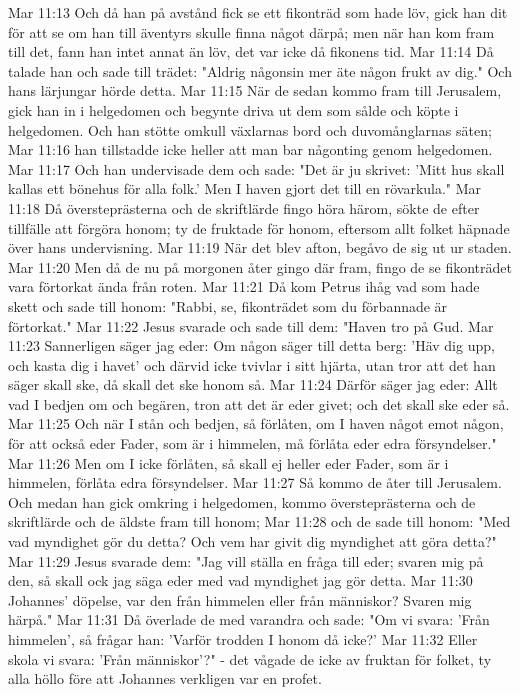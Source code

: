 Mar 11:13  Och då han på avstånd fick se ett fikonträd som hade löv, gick han dit för att se om han till äventyrs skulle finna något därpå; men när han kom fram till det, fann han intet annat än löv, det var icke då fikonens tid.
Mar 11:14  Då talade han och sade till trädet: "Aldrig någonsin mer äte någon frukt av dig." Och hans lärjungar hörde detta.
Mar 11:15  När de sedan kommo fram till Jerusalem, gick han in i helgedomen och begynte driva ut dem som sålde och köpte i helgedomen. Och han stötte omkull växlarnas bord och duvomånglarnas säten;
Mar 11:16  han tillstadde icke heller att man bar någonting genom helgedomen.
Mar 11:17  Och han undervisade dem och sade: "Det är ju skrivet: 'Mitt hus skall kallas ett bönehus för alla folk.' Men I haven gjort det till en rövarkula."
Mar 11:18  Då översteprästerna och de skriftlärde fingo höra härom, sökte de efter tillfälle att förgöra honom; ty de fruktade för honom, eftersom allt folket häpnade över hans undervisning.
Mar 11:19  När det blev afton, begåvo de sig ut ur staden.
Mar 11:20  Men då de nu på morgonen åter gingo där fram, fingo de se fikonträdet vara förtorkat ända från roten.
Mar 11:21  Då kom Petrus ihåg vad som hade skett och sade till honom: "Rabbi, se, fikonträdet som du förbannade är förtorkat."
Mar 11:22  Jesus svarade och sade till dem: "Haven tro på Gud.
Mar 11:23  Sannerligen säger jag eder: Om någon säger till detta berg: 'Häv dig upp, och kasta dig i havet' och därvid icke tvivlar i sitt hjärta, utan tror att det han säger skall ske, då skall det ske honom så.
Mar 11:24  Därför säger jag eder: Allt vad I bedjen om och begären, tron att det är eder givet; och det skall ske eder så.
Mar 11:25  Och när I stån och bedjen, så förlåten, om I haven något emot någon, för att också eder Fader, som är i himmelen, må förlåta eder edra försyndelser."
Mar 11:26  Men om I icke förlåten, så skall ej heller eder Fader, som är i himmelen, förlåta edra försyndelser.
Mar 11:27  Så kommo de åter till Jerusalem. Och medan han gick omkring i helgedomen, kommo översteprästerna och de skriftlärde och de äldste fram till honom;
Mar 11:28  och de sade till honom: "Med vad myndighet gör du detta? Och vem har givit dig myndighet att göra detta?"
Mar 11:29  Jesus svarade dem: "Jag vill ställa en fråga till eder; svaren mig på den, så skall ock jag säga eder med vad myndighet jag gör detta.
Mar 11:30  Johannes' döpelse, var den från himmelen eller från människor? Svaren mig härpå."
Mar 11:31  Då överlade de med varandra och sade: "Om vi svara: 'Från himmelen', så frågar han: 'Varför trodden I honom då icke?'
Mar 11:32  Eller skola vi svara: 'Från människor'?" - det vågade de icke av fruktan för folket, ty alla höllo före att Johannes verkligen var en profet.
